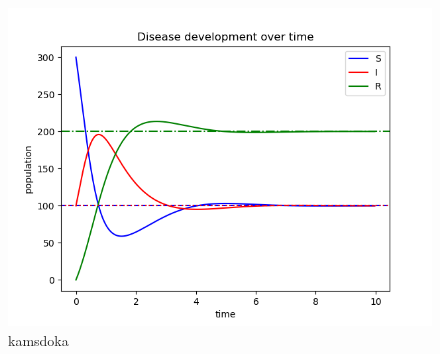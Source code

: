 \begin{figure}[!h]
    \centering
    \includegraphics[scale=0.5]{plots/default_a_4_b_1_c_0.5.png}
    \caption{kamsdoka}
    \label{fig:default}
\end{figure}